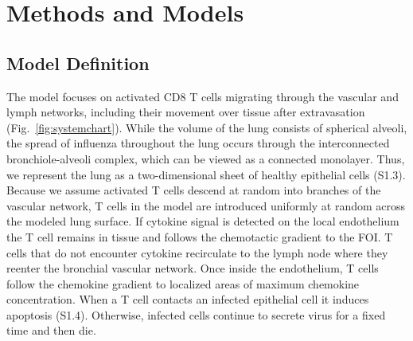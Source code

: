 \documentclass[preprint,10pt,authoryear]{elsarticle}
\begin{document}
\section*{Methods and Models}



\subsection*{Model Definition}


The model focuses on activated CD8 T cells migrating through the vascular and lymph networks, including their movement over tissue after extravasation (Fig.~\ref{fig:systemchart}).  While the volume of the lung consists of spherical alveoli, the spread of influenza throughout the lung occurs through the interconnected bronchiole-alveoli complex, which can be viewed as a connected monolayer.  Thus, we represent the lung as a two-dimensional sheet of healthy epithelial cells (S1.3).   Because we assume activated T cells descend at random into branches of the vascular network, T cells in the model are introduced uniformly at random across the modeled lung surface.  If cytokine signal is detected on the local endothelium the T cell remains in tissue and follows the chemotactic gradient to the FOI.  T cells that do not encounter cytokine recirculate to the lymph node where they reenter the bronchial vascular network.  Once inside the endothelium, T cells follow the chemokine gradient to localized areas of maximum chemokine concentration.  When a T cell contacts an infected epithelial cell it induces apoptosis (S1.4).  Otherwise, infected cells continue to secrete virus for a fixed time and then die.
\end{document}
